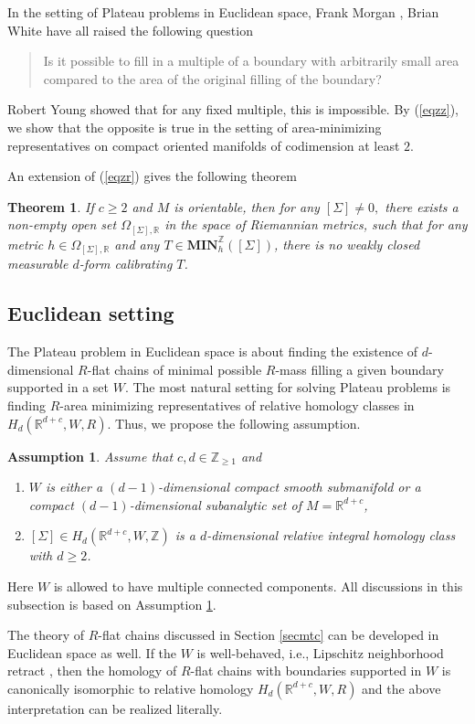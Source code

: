 \documentclass[11pt,a4paper]{amsart}
\numberwithin{equation}{section}
\newcommand{\mn}{\mathbf{MIN}}
\newcommand{\Si}{\Sigma}
\newcommand{\R}{\mathbb{R}}
\newcommand{\Z}{\mathbb{Z}}
\theoremstyle{plain}
\newtheorem{thm}{Theorem}
\newtheorem{assump}{Assumption}[subsection]
\theoremstyle{definition}
\numberwithin{equation}{subsection}
\begin{document}
In the setting of Plateau problems in Euclidean space, Frank Morgan \cite{FMmc}, Brian White \cite[Problem 1.13]{GMT} have all raised the following question
\begin{quote}
	Is it possible to fill in a multiple of a boundary with arbitrarily small area compared to the area of the original filling of the boundary?
\end{quote}
Robert Young \cite{RY} showed that for any fixed multiple, this is impossible. By (\ref{eqzz}), we show that the opposite is true in the setting of area-minimizing representatives on compact oriented manifolds of codimension at least $2$.

An extension of (\ref{eqzr}) gives the following theorem\begin{thm}\label{thmnc}
If $c\ge 2$ and $M$ is orientable, then for any $[\Si]\not=0,$ there exists a non-empty open set $\Omega_{[\Si],\R}$ in the space of Riemannian metrics, such that for any metric $h\in \Omega_{[\Si],\R}$ and any $T\in\mn_h^\Z([\Si])$, there is no weakly closed measurable $d$-form calibrating $T$.\end{thm}
	\subsection{Euclidean setting}\label{secmtb}The Plateau problem in Euclidean space is about finding the existence of $d$-dimensional $R$-flat chains of minimal possible $R$-mass filling a given boundary supported in a set $W$. The most natural setting for solving Plateau problems is finding $R$-area minimizing representatives of relative homology classes in $H_d(\R^{d+c},W,R)$. Thus, we propose the following assumption. 
\begin{assump}\label{assumpmb}	Assume that $c,d\in\Z_{\ge1}$ and
	\begin{enumerate}
	\item $W$ is either a $(d-1)$-dimensional compact smooth submanifold or a   compact $(d-1)$-dimensional subanalytic set of $M=\R^{d+c}$,\label{assumpmbr}
	\item $[\Si]\in H_d(\R^{d+c},W,\Z)$ is a $d$-dimensional relative integral homology class with $d\ge 2$.
	\end{enumerate} \end{assump}
Here $W$ is allowed to have multiple connected components. All discussions in this subsection is based on Assumption \ref{assumpmb}.

The theory of $R$-flat chains discussed in Section \ref{secmtc} can be developed in Euclidean space as well. If the $W$ is  well-behaved, i.e., Lipschitz neighborhood retract \cite[Sections 4.4.1, 4.4.5, 4.4.6]{HF}\cite[Section 3.4]{HFrf}, then the homology of $R$-flat chains with boundaries supported in $W$ is canonically isomorphic to relative homology $H_d(\R^{d+c},W,R)$ and the above interpretation can be realized literally. 
\end{document}
